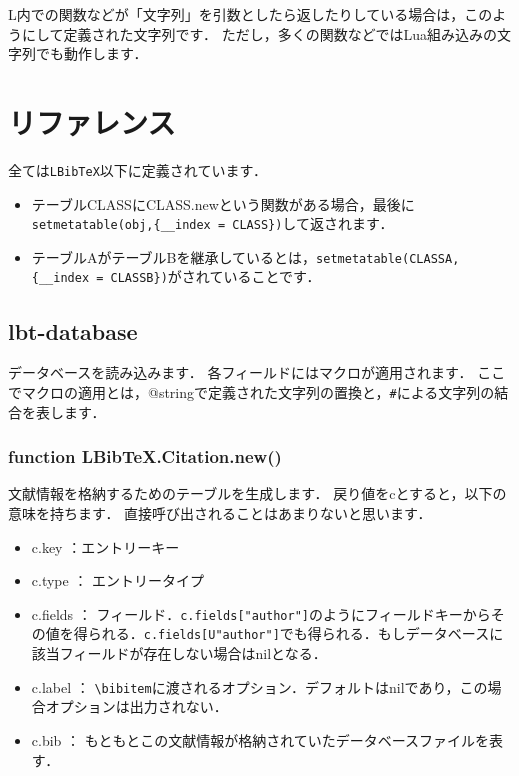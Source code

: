 \documentclass[dvipdfmx,a4paper]{jsarticle}
\DeclareRobustCommand{\LBibTeX}{L\BibTeX}
\begin{document}
\LBibTeX 内での関数などが「文字列」を引数としたら返したりしている場合は，このようにして定義された文字列です．
ただし，多くの関数などではLua組み込みの文字列でも動作します．

\section{リファレンス}
全ては\verb|LBibTeX|以下に定義されています．
\begin{itemize}
\item テーブルCLASSにCLASS.newという関数がある場合，最後に\verb|setmetatable(obj,{__index = CLASS})|して返されます．
\item テーブルAがテーブルBを継承しているとは，\verb|setmetatable(CLASSA,{__index = CLASSB})|がされていることです．
\end{itemize}

\subsection{lbt-database}\label{subsec:lbt-database}
データベースを読み込みます．
各フィールドにはマクロが適用されます．
ここでマクロの適用とは，@stringで定義された文字列の置換と，\verb|#|による文字列の結合を表します．
\subsubsection{function LBibTeX.Citation.new()}
文献情報を格納するためのテーブルを生成します．
戻り値をcとすると，以下の意味を持ちます．
直接呼び出されることはあまりないと思います．
\begin{itemize}
\item c.key ：エントリーキー
\item c.type ： エントリータイプ
\item c.fields ： フィールド．\verb|c.fields["author"]|のようにフィールドキーからその値を得られる．\verb|c.fields[U"author"]|でも得られる．もしデータベースに該当フィールドが存在しない場合はnilとなる．
\item c.label ： \verb|\bibitem|に渡されるオプション．デフォルトはnilであり，この場合オプションは出力されない．
\item c.bib ： もともとこの文献情報が格納されていたデータベースファイルを表す．
\end{itemize}
\end{document}
